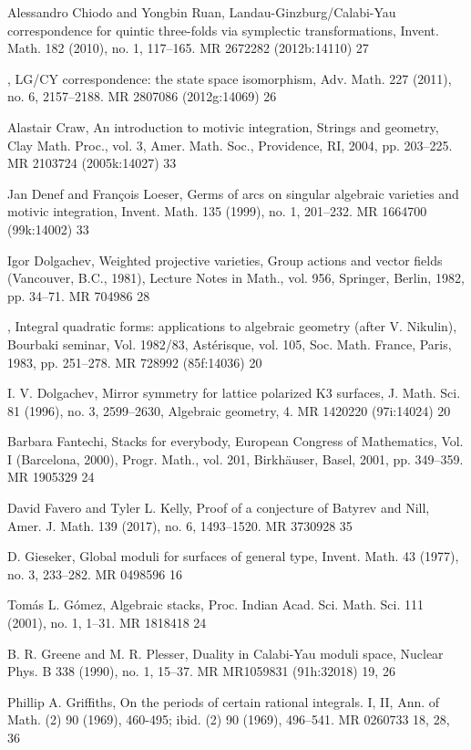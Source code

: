 {\begin{list}{}{%
  \setlength{\leftmargin}{3.8em}%
  \setlength{\itemindent}{-3.8em}%
  \setlength{\itemsep}{1.5pt}%
  \setlength{\parsep}{0pt}%
  \setlength{\listparindent}{0pt}%
}
\item[{[CR10]}] Alessandro Chiodo and Yongbin Ruan, Landau-Ginzburg/Calabi-Yau correspondence for quintic three-folds via symplectic transformations, Invent. Math. 182 (2010), no. 1, 117--165. MR 2672282 (2012b:14110) 27
\item[{[CR11]}] , LG/CY correspondence: the state space isomorphism, Adv. Math. 227 (2011), no. 6, 2157--2188. MR 2807086 (2012g:14069) 26
\item[{[Cra04]}] Alastair Craw, An introduction to motivic integration, Strings and geometry, Clay Math. Proc., vol. 3, Amer. Math. Soc., Providence, RI, 2004, pp. 203--225. MR 2103724 (2005k:14027) 33
\item[{[DL99]}] Jan Denef and François Loeser, Germs of arcs on singular algebraic varieties and motivic integration, Invent. Math. 135 (1999), no. 1, 201--232. MR 1664700 (99k:14002) 33
\item[{[Dol82]}] Igor Dolgachev, Weighted projective varieties, Group actions and vector fields (Vancouver, B.C., 1981), Lecture Notes in Math., vol. 956, Springer, Berlin, 1982, pp. 34--71. MR 704986 28
\item[{[Dol83]}] , Integral quadratic forms: applications to algebraic geometry (after V. Nikulin), Bourbaki seminar, Vol. 1982/83, Astérisque, vol. 105, Soc. Math. France, Paris, 1983, pp. 251--278. MR 728992 (85f:14036) 20
\item[{[Dol96]}] I. V. Dolgachev, Mirror symmetry for lattice polarized K3 surfaces, J. Math. Sci. 81 (1996), no. 3, 2599--2630, Algebraic geometry, 4. MR 1420220 (97i:14024) 20
\item[{[Fan01]}] Barbara Fantechi, Stacks for everybody, European Congress of Mathematics, Vol. I (Barcelona, 2000), Progr. Math., vol. 201, Birkhäuser, Basel, 2001, pp. 349--359. MR 1905329 24
\item[{[FK17]}] David Favero and Tyler L. Kelly, Proof of a conjecture of Batyrev and Nill, Amer. J. Math. 139 (2017), no. 6, 1493--1520. MR 3730928 35
\item[{[Gie77]}] D. Gieseker, Global moduli for surfaces of general type, Invent. Math. 43 (1977), no. 3, 233--282. MR 0498596 16
\item[{[Góm01]}] Tomás L. Gómez, Algebraic stacks, Proc. Indian Acad. Sci. Math. Sci. 111 (2001), no. 1, 1--31. MR 1818418 24
\item[{[GP90]}] B. R. Greene and M. R. Plesser, Duality in Calabi-Yau moduli space, Nuclear Phys. B 338 (1990), no. 1, 15--37. MR MR1059831 (91h:32018) 19, 26
\item[{[Gri69]}] Phillip A. Griffiths, On the periods of certain rational integrals. I, II, Ann. of Math. (2) 90 (1969), 460-495; ibid. (2) 90 (1969), 496--541. MR 0260733 18, 28, 36

\end{list}}
